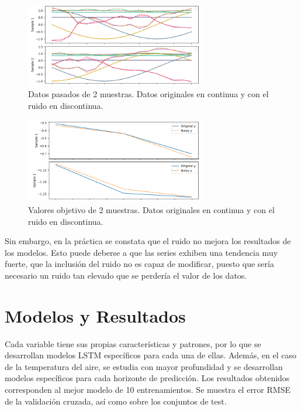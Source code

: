 \begin{figure}[H]
    \centering
    \includegraphics[width=0.7\textwidth]{images/noise_past_data.png}
    \caption{Datos pasados de 2 muestras. Datos originales en continua y con el ruido en discontinua.}
    \label{noise1}
\end{figure}

\begin{figure}[H]
    \centering
    \includegraphics[width=0.7\textwidth]{images/noise_y.png}
    \caption{Valores objetivo de 2 muestras. Datos originales en continua y con el ruido en discontinua.}
    \label{noise2}
\end{figure}

Sin embargo, en la práctica se constata que el ruido no mejora los resultados de los modelos. Esto puede deberse a que las series exhiben una tendencia muy fuerte, 
que la inclusión del ruido no es capaz de modificar, puesto que sería necesario un ruido tan elevado que se perdería el valor de los datos.

\section{Modelos y Resultados}
\label{sec:resultados}
Cada variable tiene sus propias características y patrones, por lo que se desarrollan modelos LSTM específicos para cada una de ellas. 
Además, en el caso de la temperatura del aire, se estudia con mayor profundidad y se desarrollan modelos específicos para cada horizonte de predicción.
Los resultados obtenidos corresponden al mejor modelo de 10 entrenamientos. Se muestra el error RMSE de la validación cruzada, así como sobre los conjuntos de test.

